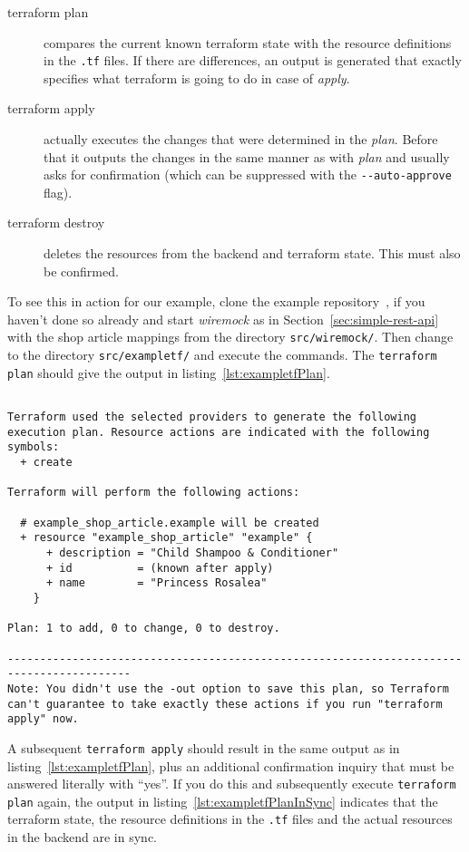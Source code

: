 \documentclass[paper=a4,11pt,numbers=noenddot]{article}
\begin{document}
\begin{description}
\item[terraform plan] compares the current known terraform state with the resource definitions in the \verb'.tf' files. If there are differences, an output is generated that exactly specifies what terraform is going to do in case of \emph{apply}.
\item[terraform apply] actually executes the changes that were determined in the \emph{plan}. Before that it outputs the changes in the same manner as with \emph{plan} and usually asks for confirmation (which can be suppressed with the \verb'--auto-approve' flag).
\item[terraform destroy] deletes the resources from the backend and terraform state. This must also be confirmed.
\end{description}

To see this in action for our example, clone the example repository~\autocite{ecky-l_terraform-provider-example_nodate}, if you haven't done so already and start \emph{wiremock} as in Section~\ref{sec:simple-rest-api} with the shop article mappings from the directory \verb'src/wiremock/'. Then change to the directory \verb'src/exampletf/' and execute the commands. The \verb'terraform plan' should give the output in listing~\ref{lst:exampletfPlan}.

\begin{lstlisting}[label=lst:exampletfPlan]

Terraform used the selected providers to generate the following execution plan. Resource actions are indicated with the following symbols:
  + create

Terraform will perform the following actions:

  # example_shop_article.example will be created
  + resource "example_shop_article" "example" {
      + description = "Child Shampoo & Conditioner"
      + id          = (known after apply)
      + name        = "Princess Rosalea"
    }

Plan: 1 to add, 0 to change, 0 to destroy.

-----------------------------------------------------------------------------------------
Note: You didn't use the -out option to save this plan, so Terraform can't guarantee to take exactly these actions if you run "terraform apply" now.

\end{lstlisting}

A subsequent \verb'terraform apply' should result in the same output as in listing~\ref{lst:exampletfPlan}, plus an additional confirmation inquiry that must be answered literally with ``yes''. If you do this and subsequently execute \verb'terraform plan' again, the output in listing~\ref{lst:exampletfPlanInSync} indicates that the terraform state, the resource definitions in the \verb'.tf' files and the actual resources in the backend are in sync.
\end{document}
